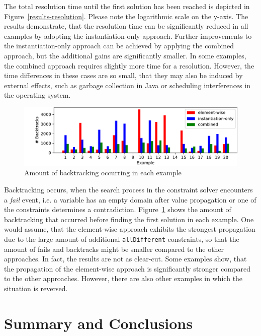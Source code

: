 \documentclass[english,biblatex]{lni}
\begin{document}
The total resolution time until the first solution has been reached is depicted in Figure~\ref{results-resolution}.
Please note the logarithmic scale on the y-axis.
The results demonstrate, that the resolution time can be significantly reduced in all examples by adopting the instantiation-only approach.
Further improvements to the instantiation-only approach can be achieved by applying the combined approach, but the additional gains are significantly smaller.
In some examples, the combined approach requires slightly more time for a resolution.
However, the time differences in these cases are so small, that they may also be induced by external effects, such as garbage collection in Java or scheduling interferences in the operating system.

\begin{figure}[h!tbp]
\centering
\includegraphics[width=\textwidth]{results-backtracks}
\caption{Amount of backtracking occurring in each example}
\label{results-backtracks}
\end{figure}

Backtracking occurs, when the search process in the constraint solver encounters a \emph{fail} event, i.e. a variable has an empty domain after value propagation or one of the constraints determines a contradiction.
Figure~\ref{results-backtracks} shows the amount of backtracking that occurred before finding the first solution in each example.
One would assume, that the element-wise approach exhibits the strongest propagation due to the large amount of additional \texttt{allDifferent} constraints, so that the amount of fails and backtracks might be smaller compared to the other approaches.
In fact, the results are not as clear-cut.
Some examples show, that the propagation of the element-wise approach is significantly stronger compared to the other approaches.
However, there are also other examples in which the situation is reversed.

\section{Summary and Conclusions}
\end{document}
